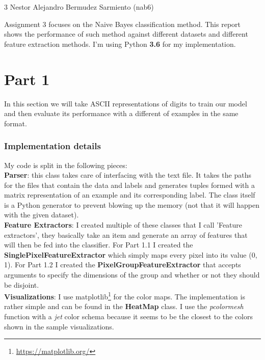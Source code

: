 \documentclass[11pt]{article}
\begin{document}
\homework
    {3}
    {Nestor Alejandro Bermudez Sarmiento (nab6)}
    {}

Assignment 3 focuses on the Naive Bayes classification method. This report shows the performance of such method against different datasets and different feature extraction methods. I'm using Python \textbf{3.6} for my implementation.

\section*{Part 1}

In this section we will take ASCII representations of digits to train our model and then evaluate its performance with a different of examples in the same format.

\subsubsection*{Implementation details}
My code is split in the following pieces:\\

\textbf{Parser}: this class takes care of interfacing with the text file. It takes the paths for the files that contain the data and labels and generates tuples formed with a matrix representation of an example and its corresponding label. The class itself is a Python generator to prevent blowing up the memory (not that it will happen with the given dataset).\\

\textbf{Feature Extractors}: I created multiple of these classes that I call 'Feature extractors', they basically take an item and generate an array of features that will then be fed into the classifier. For Part 1.1 I created the \textbf{SinglePixelFeatureExtractor} which simply maps every pixel into its value (0, 1). For Part 1.2 I created the \textbf{PixelGroupFeatureExtractor} that accepts arguments to specify the dimensions of the group and whether or not they should be disjoint.\\

\textbf{Visualizations}: I use matplotlib\footnote{\url{https://matplotlib.org/}} for the color maps. The implementation is rather simple and can be found in the \textbf{HeatMap} class. I use the \textit{pcolormesh} function with a \textit{jet} color schema because it seems to be the closest to the colors shown in the sample visualizations. \\
\end{document}

